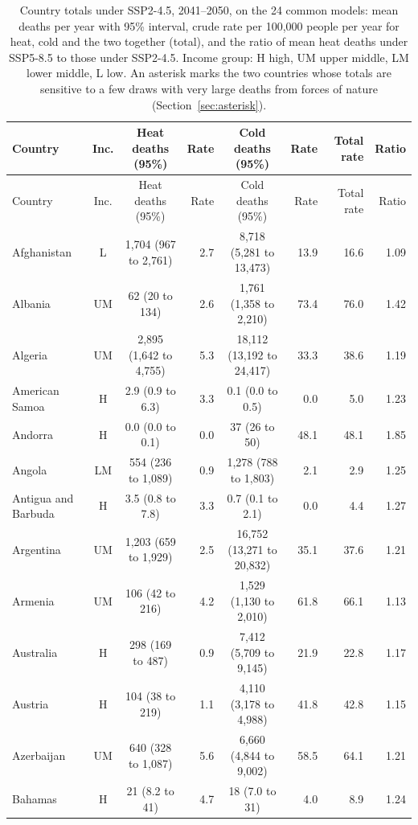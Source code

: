 \begin{longtable}{lccrcrrr}
\caption{Country totals under SSP2-4.5, 2041--2050, on the 24 common models: mean deaths per year with 95\% interval, crude rate per 100,000 people per year for heat, cold and the two together (total), and the ratio of mean heat deaths under SSP5-8.5 to those under SSP2-4.5. Income group: H high, UM upper middle, LM lower middle, L low. An asterisk marks the two countries whose totals are sensitive to a few draws with very large deaths from forces of nature (Section~\ref{sec:asterisk}).}\label{tab:country}\\
\toprule
Country & Inc. & Heat deaths (95\%) & Rate & Cold deaths (95\%) & Rate & Total rate & Ratio \\
\midrule
\endfirsthead
\toprule
Country & Inc. & Heat deaths (95\%) & Rate & Cold deaths (95\%) & Rate & Total rate & Ratio \\
\midrule
\endhead
\bottomrule
\endfoot
Afghanistan & L & 1,704 (967 to 2,761) & 2.7 & 8,718 (5,281 to 13,473) & 13.9 & 16.6 & 1.09 \\
Albania & UM & 62 (20 to 134) & 2.6 & 1,761 (1,358 to 2,210) & 73.4 & 76.0 & 1.42 \\
Algeria & UM & 2,895 (1,642 to 4,755) & 5.3 & 18,112 (13,192 to 24,417) & 33.3 & 38.6 & 1.19 \\
American Samoa & H & 2.9 (0.9 to 6.3) & 3.3 & 0.1 (0.0 to 0.5) & 0.0 & 5.0 & 1.23 \\
Andorra & H & 0.0 (0.0 to 0.1) & 0.0 & 37 (26 to 50) & 48.1 & 48.1 & 1.85 \\
Angola & LM & 554 (236 to 1,089) & 0.9 & 1,278 (788 to 1,803) & 2.1 & 2.9 & 1.25 \\
Antigua and Barbuda & H & 3.5 (0.8 to 7.8) & 3.3 & 0.7 (0.1 to 2.1) & 0.0 & 4.4 & 1.27 \\
Argentina & UM & 1,203 (659 to 1,929) & 2.5 & 16,752 (13,271 to 20,832) & 35.1 & 37.6 & 1.21 \\
Armenia & UM & 106 (42 to 216) & 4.2 & 1,529 (1,130 to 2,010) & 61.8 & 66.1 & 1.13 \\
Australia & H & 298 (169 to 487) & 0.9 & 7,412 (5,709 to 9,145) & 21.9 & 22.8 & 1.17 \\
Austria & H & 104 (38 to 219) & 1.1 & 4,110 (3,178 to 4,988) & 41.8 & 42.8 & 1.15 \\
Azerbaijan & UM & 640 (328 to 1,087) & 5.6 & 6,660 (4,844 to 9,002) & 58.5 & 64.1 & 1.21 \\
Bahamas & H & 21 (8.2 to 41) & 4.7 & 18 (7.0 to 31) & 4.0 & 8.9 & 1.24 \\

\end{longtable}
